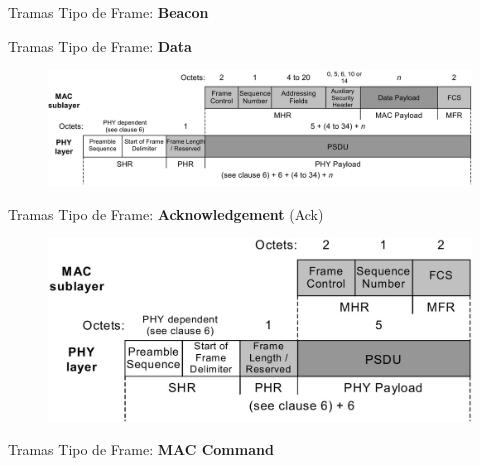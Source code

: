 \documentclass[aspectratio=169, handout]{beamer}
\begin{document}
\begin{frame}[t]{Tramas}
Tipo de Frame: \textbf{Beacon}
\vspace{10px}
	\begin{figure}[H]
	\end{figure}	  	  	
\end{frame}

\begin{frame}[t]{Tramas}
Tipo de Frame: \textbf{Data}
\vspace{10px}
	\begin{figure}[H]
		\includegraphics[width=1\textwidth]{./imagenes/data.jpg}
	\end{figure}	  	  	
\end{frame}


\begin{frame}[t]{Tramas}
Tipo de Frame: \textbf{Acknowledgement} (Ack)
\vspace{10px}
	\begin{figure}[H]
	\centering
		\includegraphics[width=.7\textwidth]{./imagenes/ack.jpg}
	\end{figure}	  	  	
\end{frame}

\begin{frame}[t]{Tramas}
Tipo de Frame: \textbf{MAC Command}
\vspace{10px}
	\begin{figure}[H]
	\end{figure}	  	  	
\end{frame}
\end{document}
